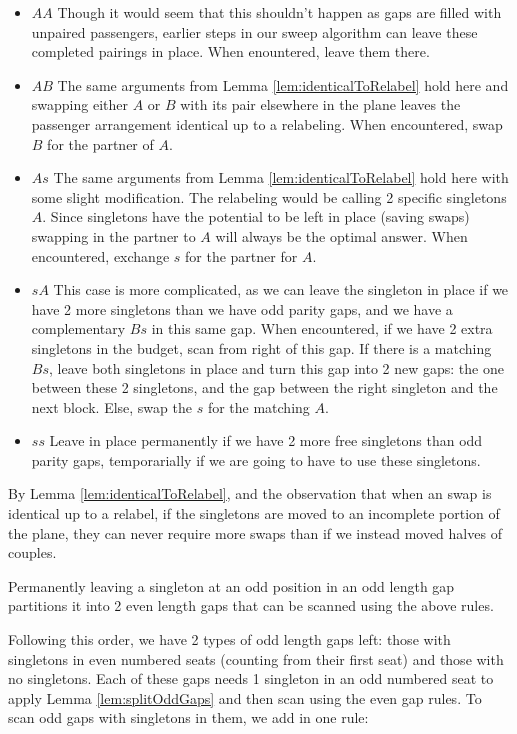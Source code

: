 \begin{itemize}
\item $AA$ 
Though it would seem that this shouldn't happen as gaps are filled with unpaired passengers, earlier steps in our sweep algorithm can leave these completed pairings in place.  When enountered, leave them there.
\item $AB$ 
The same arguments from Lemma \ref{lem:identicalToRelabel} hold here and swapping either $A$ or $B$ with its pair elsewhere in the plane leaves the passenger arrangement identical up to a relabeling.  When encountered, swap $B$ for the partner of $A$.
\item $As$
The same arguments from Lemma \ref{lem:identicalToRelabel} hold here with some slight modification. The relabeling would be calling 2 specific singletons $A$.  Since singletons have the potential to be left in place (saving swaps) swapping in the partner to $A$ will always be the optimal answer.  When encountered, exchange $s$ for the partner for $A$.
\item $sA$ 
This case is more complicated, as we can leave the singleton in place if we have 2 more singletons than we have odd parity gaps, and we have a complementary $Bs$ in this same gap.  When encountered, if we have 2 extra singletons in the budget, scan from right of this gap. If there is a matching $Bs$, leave both singletons in place and turn this gap into 2 new gaps: the one between these 2 singletons, and the gap between the right singleton and the next block.  Else, swap the $s$ for the matching $A$.
\item $ss$ 
Leave in place permanently if we have 2 more free singletons than odd parity gaps, temporarially if we are going to have to use these singletons.
\end{itemize}

By Lemma \ref{lem:identicalToRelabel}, and the observation that when an swap is identical up to a relabel, if the singletons are moved to an incomplete portion of the plane, they can never require more swaps than if we instead moved halves of couples.

\begin{lem} \label{lem:splitOddGaps}
Permanently leaving a singleton at an odd position in an odd length gap partitions it into 2 even length gaps that can be scanned using the above rules.
\end{lem}

Following this order, we have 2 types of odd length gaps left: those with singletons in even numbered seats (counting from their first seat) and those with no singletons.  Each of these gaps needs 1 singleton in an odd numbered seat to apply Lemma \ref{lem:splitOddGaps} and then scan using the even gap rules.  To scan odd gaps with singletons in them, we add in one rule:

